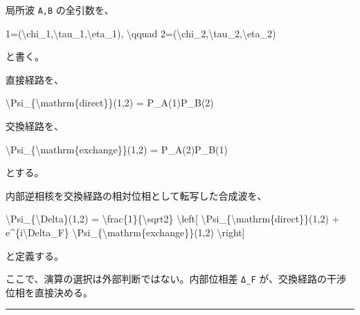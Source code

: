 \documentclass[
  a4paper,
]{article}
\newenvironment{Shaded}{}{}
\newcommand{\NormalTok}[1]{#1}
\begin{document}
局所波 \texttt{A,B} の全引数を、

\begin{Shaded}
\begin{Highlighting}[]
\NormalTok{1=(\textbackslash{}chi\_1,\textbackslash{}tau\_1,\textbackslash{}eta\_1),}
\NormalTok{\textbackslash{}qquad}
\NormalTok{2=(\textbackslash{}chi\_2,\textbackslash{}tau\_2,\textbackslash{}eta\_2)}
\end{Highlighting}
\end{Shaded}

と書く。

直接経路を、

\begin{Shaded}
\begin{Highlighting}[]
\NormalTok{\textbackslash{}Psi\_\{\textbackslash{}mathrm\{direct\}\}(1,2)}
\NormalTok{=}
\NormalTok{P\_A(1)P\_B(2)}
\end{Highlighting}
\end{Shaded}

交換経路を、

\begin{Shaded}
\begin{Highlighting}[]
\NormalTok{\textbackslash{}Psi\_\{\textbackslash{}mathrm\{exchange\}\}(1,2)}
\NormalTok{=}
\NormalTok{P\_A(2)P\_B(1)}
\end{Highlighting}
\end{Shaded}

とする。

内部逆相核を交換経路の相対位相として転写した合成波を、

\begin{Shaded}
\begin{Highlighting}[]
\NormalTok{\textbackslash{}Psi\_\{\textbackslash{}Delta\}(1,2)}
\NormalTok{=}
\NormalTok{\textbackslash{}frac\{1\}\{\textbackslash{}sqrt2\}}
\NormalTok{\textbackslash{}left[}
\NormalTok{\textbackslash{}Psi\_\{\textbackslash{}mathrm\{direct\}\}(1,2)}
\NormalTok{+}
\NormalTok{e\^{}\{i\textbackslash{}Delta\_F\}}
\NormalTok{\textbackslash{}Psi\_\{\textbackslash{}mathrm\{exchange\}\}(1,2)}
\NormalTok{\textbackslash{}right]}
\end{Highlighting}
\end{Shaded}

と定義する。

ここで、演算の選択は外部判断ではない。内部位相差 \texttt{Δ\_F}
が、交換経路の干渉位相を直接決める。

\begin{center}\rule{0.5\linewidth}{0.5pt}\end{center}
\end{document}
